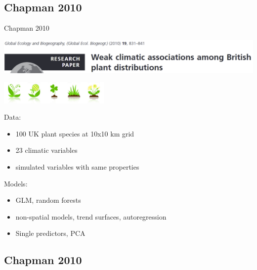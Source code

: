 \documentclass[
  ignorenonframetext,
]{beamer}
\providecommand{\tightlist}{%
  \setlength{\itemsep}{0pt}\setlength{\parskip}{0pt}}
\begin{document}
\hypertarget{chapman-2010}{%
\subsection{Chapman 2010}\label{chapman-2010}}

\begin{frame}{Chapman 2010}
\small

\includegraphics{chap_header.png}

\includegraphics[width=0.4\textwidth,height=\textheight]{picto_plants.jpg}

Data:

\begin{itemize}
\tightlist
\item
  100 UK plant species at 10x10 km grid
\item
  23 climatic variables
\item
  simulated variables with same properties
\end{itemize}

Models:

\begin{itemize}
\tightlist
\item
  GLM, random forests
\item
  non-spatial models, trend surfaces, autoregression
\item
  Single predictors, PCA
\end{itemize}
\end{frame}

\hypertarget{chapman-2010-1}{%
\subsection{Chapman 2010}\label{chapman-2010-1}}
\end{document}
